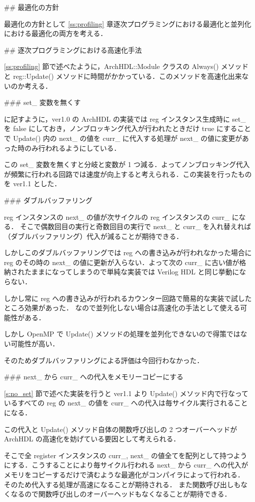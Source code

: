 ## 最適化の方針

最適化の方針として \ref{ss:profiling} 章逐次プログラミングにおける最適化と並列化における最適化の両方を考える．


## 逐次プログラミングにおける高速化手法

\ref{ss:profiling} 節で述べたように，ArchHDL::Module クラスの Always() メソッドと
reg::Update() メソッドに時間がかかっている．このメソッドを高速化出来ないのか考える．


### set_ 変数を無くす \label{s:no_set}

 に記すように，ver1.0 の ArchHDL の実装では reg インスタンス生成時に set_ を false
にしておき，ノンブロッキング代入が行われたときだけ true にすることで
Update() 内の next_ の値を curr_
に代入する処理が next_ の値に変更があった時のみ行われるようにしている．

この set_ 変数を無くすと分岐と変数が 1 つ減る．よってノンブロッキング代入が頻繁に行われる回路では速度が向上すると考えられる．この実装を行ったものを ver1.1 とした．



### ダブルバッファリング

reg インスタンスの next_ の値が次サイクルの reg インスタンスの curr_ になる．
そこで偶数回目の実行と奇数回目の実行で next_ と curr_
を入れ替えれば（ダブルバッファリング）代入が減ることが期待できる．

しかしこのダブルバッファリングでは reg への書き込みが行われなかった場合に
reg のその時の next_ の値に更新が入らない．よって次の
curr_ に古い値が格納されたままになってしまうので単純な実装では Verilog HDL と同じ挙動にならない．

しかし常に reg への書き込みが行われるカウンター回路で簡易的な実装で試したところ効果があった．
なので並列化しない場合は高速化の手法として使える可能性がある．

しかし OpenMP で Update() メソッドの処理を並列化できないので得策ではない可能性が高い．

そのためダブルバッファリングによる評価は今回行わなかった．


### next_ から curr_ への代入をメモリーコピーにする

\ref{s:no_set} 節で述べた実装を行うと ver1.1 より
Update() メソッド内で行なっているすべての reg の next_
の値を curr_ への代入は毎サイクル実行されることになる．

この代入と Update() メソッド自体の関数呼び出しの
2 つオーバーヘッドが ArchHDL の高速化を妨げている要因として考えられる．

そこで全 register インスタンスの curr_, next_
の値全てを配列として持つようにする．こうすることにより毎サイクル行われる next_ から curr_
への代入がメモリをコピーするだけで済むような最適化がコンパイラによって行われる．
そのため代入する処理が高速になることが期待される．
また関数呼び出しもなくなるので関数呼び出しのオーバーヘッドもなくなることが期待できる．

